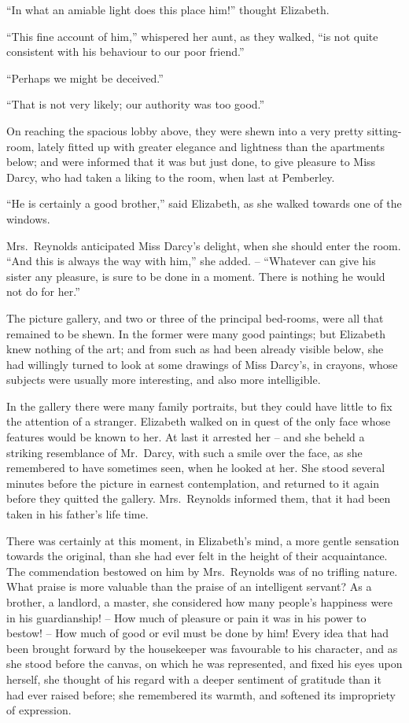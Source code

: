 “In what an amiable light does this place him!”
thought Elizabeth.

“This fine account of him,” whispered her aunt, as they
walked, “is not quite consistent with his behaviour to our
poor friend.”

“Perhaps we might be deceived.”

“That is not very likely; our authority was too good.”

On reaching the spacious lobby above, they were shewn
into a very pretty sitting-room, lately fitted up with
greater elegance and lightness than the apartments below;
and were informed that it was but just done, to give
pleasure to Miss Darcy, who had taken a liking to the room,
when last at Pemberley.

“He is certainly a good brother,” said Elizabeth, as
she walked towards one of the windows.

Mrs.\ Reynolds anticipated Miss Darcy’s delight, when
she should enter the room. “And this is always the way
with him,” she added. -- “Whatever can give his sister
any pleasure, is sure to be done in a moment. There is
nothing he would not do for her.”

The picture gallery, and two or three of the principal
bed-rooms, were all that remained to be shewn. In the
former were many good paintings; but Elizabeth knew
nothing of the art; and from such as had been already
visible below, she had willingly turned to look at some
drawings of Miss Darcy’s, in crayons, whose subjects were
usually more interesting, and also more intelligible.

In the gallery there were many family portraits, but
they could have little to fix the attention of a stranger.
Elizabeth walked on in quest of the only face whose
features would be known to her. At last it arrested her -- and
she beheld a striking resemblance of Mr.\ Darcy, with
such a smile over the face, as she remembered to have
sometimes seen, when he looked at her. She stood several
minutes before the picture in earnest contemplation, and
returned to it again before they quitted the gallery.
Mrs.\ Reynolds informed them, that it had been taken in
his father’s life time.

There was certainly at this moment, in Elizabeth’s
mind, a more gentle sensation towards the original, than
she had ever felt in the height of their acquaintance.
The commendation bestowed on him by Mrs.\ Reynolds
was of no trifling nature. What praise is more valuable
than the praise of an intelligent servant? As a brother,
a landlord, a master, she considered how many people’s
happiness were in his guardianship! -- How much of
pleasure or pain it was in his power to bestow! -- How
much of good or evil must be done by him! Every idea
that had been brought forward by the housekeeper was
favourable to his character, and as she stood before the
canvas, on which he was represented, and fixed his eyes
upon herself, she thought of his regard with a deeper
sentiment of gratitude than it had ever raised before;
she remembered its warmth, and softened its impropriety
of expression.

